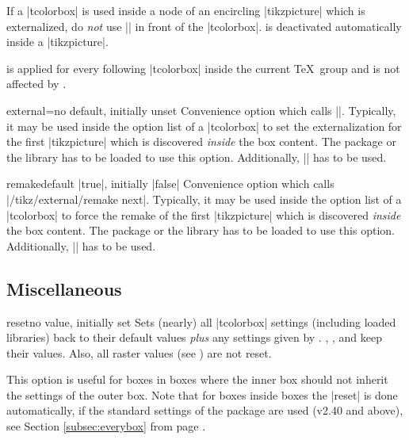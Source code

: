\begin{marker}
If a |tcolorbox| is used inside a node of an encircling |tikzpicture| which is externalized,
do \emph{not} use |\tikzexternaldisable| in front of the |tcolorbox|.
 is deactivated automatically inside a |tikzpicture|.
\end{marker}

\begin{marker}
 is applied for every following |tcolorbox|
inside the current \TeX\ group and is not affected by .
\end{marker}

\begin{docTcbKey}{external}{=}{no default, initially unset}
  Convenience option which calls ||. Typically,
  it may be used inside the option list of a |tcolorbox| to set the
  externalization  for the first |tikzpicture| which is discovered
  \emph{inside} the box content.
  The package  \cite{tantau:tikz_and_pgf} or the library  has to be loaded to use this option.
  Additionally, |\usetikzlibrary{external}| has to be used.
\end{docTcbKey}

\begin{docTcbKey}{remake}{}{default |true|, initially |false|}
  Convenience option which calls |/tikz/external/remake next|. Typically,
  it may be used inside the option list of a |tcolorbox| to force the remake
  of the first |tikzpicture| which is discovered \emph{inside} the box content.
  The package  \cite{tantau:tikz_and_pgf} or the library  has to be loaded to use this option.
  Additionally, |\usetikzlibrary{external}| has to be used.
\end{docTcbKey}


\clearpage
\subsection{Miscellaneous}
\begin{docTcbKey}{reset}{}{no value, initially set}
Sets (nearly) all |tcolorbox| settings (including loaded libraries) back to their default values
\emph{plus} any settings given by .
, , and
 keep their values.
Also, all raster values (see ) are not reset.

This option is useful for boxes in boxes where the inner box should not inherit
the settings of the outer box.
Note that for boxes inside boxes the |reset| is done automatically, if the
standard settings of the package are used (v2.40 and above), see
Section \ref{subsec:everybox} from page \pageref{subsec:everybox}.
\end{docTcbKey}




